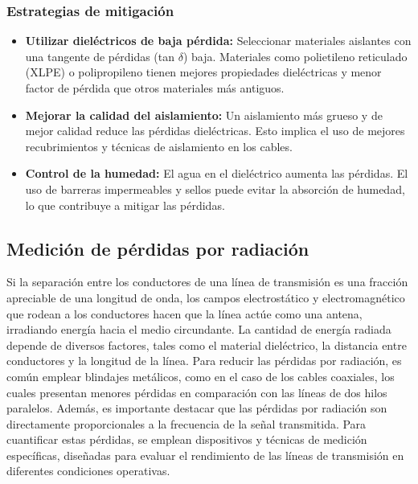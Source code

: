         \subsubsection{Estrategias de mitigación}

           \begin{itemize}
                \item \textbf{Utilizar dieléctricos de baja pérdida:} Seleccionar materiales aislantes con una tangente de pérdidas (tan $\delta$) baja. Materiales como polietileno reticulado (XLPE) o polipropileno tienen mejores propiedades dieléctricas y menor factor de pérdida que otros materiales más antiguos.

                \item \textbf{Mejorar la calidad del aislamiento:}  Un aislamiento más grueso y de mejor calidad reduce las pérdidas dieléctricas. Esto implica el uso de mejores recubrimientos y técnicas de aislamiento en los cables.

                \item \textbf{Control de la humedad:}  El agua en el dieléctrico aumenta las pérdidas. El uso de barreras impermeables y sellos puede evitar la absorción de humedad, lo que contribuye a mitigar las pérdidas.
            \end{itemize}



 

            

    \subsection{Medición de pérdidas por radiación}

        Si la separación entre los conductores de una línea de transmisión es una fracción apreciable de una longitud de onda, los campos electrostático y electromagnético que rodean a los conductores hacen que la línea actúe como una antena, irradiando energía hacia el medio circundante. La cantidad de energía radiada depende de diversos factores, tales como el material dieléctrico, la distancia entre conductores y la longitud de la línea. Para reducir las pérdidas por radiación, es común emplear blindajes metálicos, como en el caso de los cables coaxiales, los cuales presentan menores pérdidas en comparación con las líneas de dos hilos paralelos. Además, es importante destacar que las pérdidas por radiación son directamente proporcionales a la frecuencia de la señal transmitida. Para cuantificar estas pérdidas, se emplean dispositivos y técnicas de medición específicas, diseñadas para evaluar el rendimiento de las líneas de transmisión en diferentes condiciones operativas.

